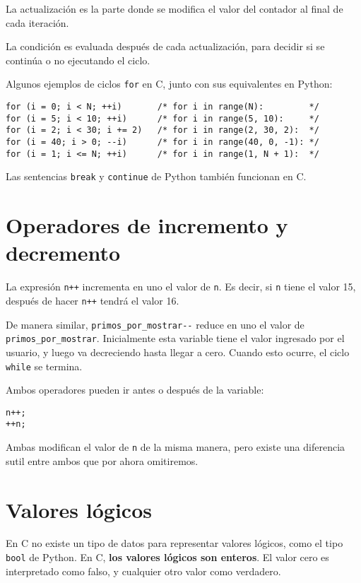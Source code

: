 La actualización es la parte donde se modifica el valor del contador al
final de cada iteración.

La condición es evaluada después de cada actualización, para decidir si
se continúa o no ejecutando el ciclo.

Algunos ejemplos de ciclos \lstinline!for! en C, junto con sus
equivalentes en Python:

\begin{lstlisting}
for (i = 0; i < N; ++i)       /* for i in range(N):         */
for (i = 5; i < 10; ++i)      /* for i in range(5, 10):     */
for (i = 2; i < 30; i += 2)   /* for i in range(2, 30, 2):  */
for (i = 40; i > 0; --i)      /* for i in range(40, 0, -1): */
for (i = 1; i <= N; ++i)      /* for i in range(1, N + 1):  */
\end{lstlisting}

Las sentencias \lstinline!break! y \lstinline!continue! de Python
también funcionan en C.

\section{Operadores de incremento y decremento}

La expresión \lstinline!n++! incrementa en uno el valor de
\lstinline!n!. Es decir, si \lstinline!n! tiene el valor 15, después de
hacer \lstinline!n++! tendrá el valor 16.

De manera similar, \lstinline!primos_por_mostrar--! reduce en uno el
valor de \lstinline!primos_por_mostrar!. Inicialmente esta variable
tiene el valor ingresado por el usuario, y luego va decreciendo hasta
llegar a cero. Cuando esto ocurre, el ciclo \lstinline!while! se
termina.

Ambos operadores pueden ir antes o después de la variable:

\begin{lstlisting}
n++;
++n;
\end{lstlisting}

Ambas modifican el valor de \lstinline!n! de la misma manera, pero
existe una diferencia sutil entre ambos que por ahora omitiremos.

\section{Valores lógicos}

En C no existe un tipo de datos para representar valores lógicos, como
el tipo \lstinline!bool! de Python. En C, \textbf{los valores lógicos
son enteros}. El valor cero es interpretado como falso, y cualquier otro
valor como verdadero.

